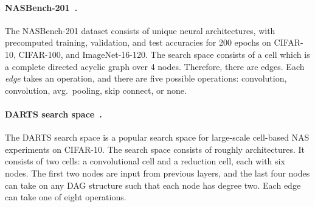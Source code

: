 \documentclass[11pt]{article}
\let\citep\cite
\numberwithin{equation}{section}
\numberwithin{figure}{section}
\theoremstyle{plain}
\theoremstyle{definition}
\begin{document}
\paragraph{NASBench-201~\citep{nasbench201}.}
The NASBench-201 dataset consists of  unique neural architectures, 
with precomputed training, validation,
and test accuracies for 200 epochs on CIFAR-10, CIFAR-100, and ImageNet-16-120.
The search space consists of a cell which is a complete directed acyclic graph 
over 4 nodes.
Therefore, there are  edges.
Each \emph{edge} takes an operation, and there are five possible operations: 
 convolution,  convolution, 
 avg.\ pooling, skip connect, or none.


\paragraph{DARTS search space~\citep{darts}.}
The DARTS search space is a popular search space for large-scale cell-based
NAS experiments on CIFAR-10.
The search space consists of roughly  architectures.
It consists of two cells: a convolutional cell and a reduction cell, each with six nodes. 
The first two nodes are input from previous layers, and the last four nodes can take
on any DAG structure such that each node has degree two.
Each edge can take one of eight operations.
\end{document}
